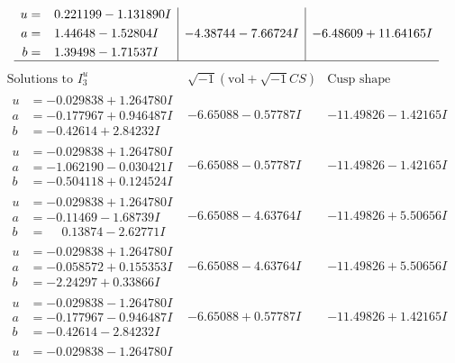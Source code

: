 \documentclass[1p]{elsarticle_modified}
\theoremstyle{definition}
\newcommand{\I}{\sqrt{-1}}
\begin{document}
$$\begin{array}{c|c|c}
\begin{aligned}
u &= \phantom{-}0.221199 - 1.131890 I \\
a &= \phantom{-}1.44648 - 1.52804 I \\
b &= \phantom{-}1.39498 - 1.71537 I\end{aligned}
 & -4.38744 - 7.66724 I & -6.48609 + 11.64165 I\\
 \hline 
 \end{array}$$\newpage$$\begin{array}{c|c|c}  
\text{Solutions to }I^u_{3}& \I (\text{vol} + \sqrt{-1}CS) & \text{Cusp shape}\\
 \hline 
\begin{aligned}
u &= -0.029838 + 1.264780 I \\
a &= -0.177967 + 0.946487 I \\
b &= -0.42614 + 2.84232 I\end{aligned}
 & -6.65088 - 0.57787 I & -11.49826 - 1.42165 I \\ \hline\begin{aligned}
u &= -0.029838 + 1.264780 I \\
a &= -1.062190 - 0.030421 I \\
b &= -0.504118 + 0.124524 I\end{aligned}
 & -6.65088 - 0.57787 I & -11.49826 - 1.42165 I \\ \hline\begin{aligned}
u &= -0.029838 + 1.264780 I \\
a &= -0.11469 - 1.68739 I \\
b &= \phantom{-}0.13874 - 2.62771 I\end{aligned}
 & -6.65088 - 4.63764 I & -11.49826 + 5.50656 I \\ \hline\begin{aligned}
u &= -0.029838 + 1.264780 I \\
a &= -0.058572 + 0.155353 I \\
b &= -2.24297 + 0.33866 I\end{aligned}
 & -6.65088 - 4.63764 I & -11.49826 + 5.50656 I \\ \hline\begin{aligned}
u &= -0.029838 - 1.264780 I \\
a &= -0.177967 - 0.946487 I \\
b &= -0.42614 - 2.84232 I\end{aligned}
 & -6.65088 + 0.57787 I & -11.49826 + 1.42165 I \\ \hline\begin{aligned}
u &= -0.029838 - 1.264780 I \\

\end{aligned}
\end{array}$$
\end{document}
